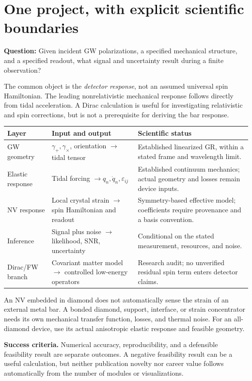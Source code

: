 \documentclass[a4paper,11pt]{article}
\newcommand{\eps}{\varepsilon}
\begin{document}
\section{One project, with explicit scientific boundaries}
\label{sec:scope}

\textbf{Question:} Given incident GW polarizations, a specified mechanical structure, and a specified readout, what signal and uncertainty result during a finite observation?

The common object is the \emph{detector response}, not an assumed universal spin Hamiltonian. The leading nonrelativistic mechanical response follows directly from tidal acceleration. A Dirac calculation is useful for investigating relativistic and spin corrections, but is not a prerequisite for deriving the bar response.

\begin{tabularx}{\textwidth}{@{}P{28mm}XX@{}}
\toprule
Layer & Input and output & Scientific status \\
\midrule
GW geometry & $\gamma_{+},\gamma_\times$, orientation $\to$ tidal tensor & Established linearized GR, within a stated frame and wavelength limit.\\
Elastic response & Tidal forcing $\to q_n,\dot q_n,\eps_{ij}$ & Established continuum mechanics; actual geometry and losses remain device inputs.\\
NV response & Local crystal strain $\to$ spin Hamiltonian and readout & Symmetry-based effective model; coefficients require provenance and a basis convention.\\
Inference & Signal plus noise $\to$ likelihood, SNR, uncertainty & Conditional on the stated measurement, resources, and noise.\\
Dirac/FW branch & Covariant matter model $\to$ controlled low-energy operators & Research audit; no unverified residual spin term enters detector claims.\\
\bottomrule
\end{tabularx}

An NV embedded in diamond does not automatically sense the strain of an external metal bar. A bonded diamond, support, interface, or strain concentrator needs its own mechanical transfer function, losses, and thermal noise. For an all-diamond device, use its actual anisotropic elastic response and feasible geometry.

\textbf{Success criteria.} Numerical accuracy, reproducibility, and a defensible feasibility result are separate outcomes. A negative feasibility result can be a useful calculation, but neither publication novelty nor career value follows automatically from the number of modules or visualizations.
\end{document}

